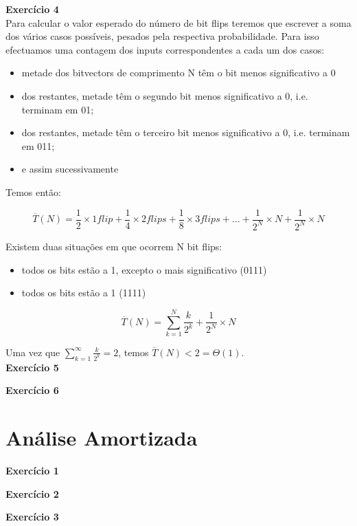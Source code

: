 \documentclass[a4paper,11pt]{article}
\begin{document}
	\noindent \textbf{Exercício 4}\\
	
	\noindent Para calcular o valor esperado do número de bit flips teremos que escrever a soma dos vários casos possíveis, pesados pela respectiva probabilidade. Para isso efectuamos uma contagem dos inputs correspondentes a cada um dos casos:
	
	\begin{itemize}
		\item metade dos bitvectors de comprimento N têm o bit menos significativo a 0
		\item dos restantes, metade têm o segundo bit menos significativo a 0, i.e. terminam em 01;
		\item dos restantes, metade têm o terceiro bit menos significativo a 0, i.e. terminam em 011;
		\item e assim sucessivamente
	\end{itemize}
	
	\noindent Temos então:
	
	\[
		\overline{T}(N) = \frac{1}{2} \times 1 flip + \frac{1}{4} \times 2 flips + \frac{1}{8} \times 3 flips + ... + \frac{1}{2^N} \times N + \frac{1}{2^N} \times N
	\]
	
	\noindent Existem duas situações em que ocorrem N bit flips:
	
	\begin{itemize}
		\item todos os bits estão a 1, excepto o mais significativo (0111)
		\item todos os bits estão a 1 (1111)
	\end{itemize}
	\[
		\overline{T}(N) = \sum_{k=1}^{N} \frac{k}{2^k} + \frac{1}{2^N} \times N
	\]
	
	\noindent Uma vez que $ \sum_{k=1}^{\infty} \frac{k}{2^k} = 2 $, temos $ \overline{T}(N) < 2 = \Theta(1) $.\\
	
	\noindent \textbf{Exercício 5}
	
	\noindent \textbf{Exercício 6}
	
	
	\section{Análise Amortizada}
	
	\noindent \textbf{Exercício 1}
	
	\noindent \textbf{Exercício 2}
	
	\noindent \textbf{Exercício 3}
	
	
\end{document}
